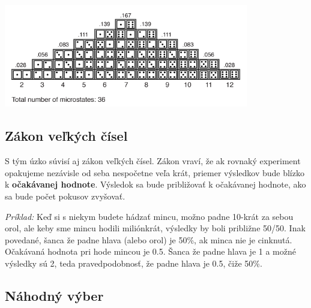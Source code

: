 \begin{center}

\includegraphics[width=0.8\textwidth,height=\textheight]{diplomka obrazky/5.png}

\end{center}

\hypertarget{zuxe1kon-veux13ekuxfdch-ux10duxedsel}{%
\subsection{Zákon veľkých
čísel}\label{zuxe1kon-veux13ekuxfdch-ux10duxedsel}}

S tým úzko súvisí aj zákon veľkých čísel. Zákon vraví, že ak rovnaký
experiment opakujeme nezávisle od seba nespočetne veľa krát, priemer
výsledkov bude blízko k \textbf{očakávanej hodnote}. Výsledok sa bude
približovať k očakávanej hodnote, ako sa bude počet pokusov zvyšovať.

\emph{Príklad:} Keď si s niekym budete hádzať mincu, možno padne 10-krát
za sebou orol, ale keby sme mincu hodili miliónkrát, výsledky by boli
približne 50/50. Inak povedané, šanca že padne hlava (alebo orol) je
50\%, ak minca nie je cinknutá. Očakávaná hodnota pri hode mincou je
0.5. Šanca že padne hlava je 1 a možné výsledky sú 2, teda
pravedpodobnosť, že padne hlava je 0.5, čiže 50\%.

\hypertarget{nuxe1hodnuxfd-vuxfdber}{%
\subsection{Náhodný výber}\label{nuxe1hodnuxfd-vuxfdber}}

